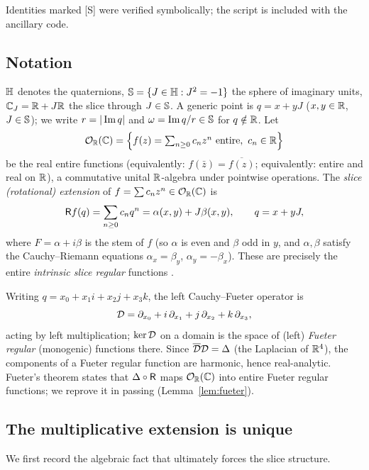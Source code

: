 \documentclass[11pt]{amsart}
\theoremstyle{definition}
\theoremstyle{remark}
\begin{document}
Identities marked [S] were verified symbolically; the script is included
with the ancillary code.

\subsection{Notation}\label{app:notation}

$\mathbb{H}$ denotes the quaternions, $\mathbb{S}=\{J\in\mathbb{H}: J^2=-1\}$ the sphere of
imaginary units, $\mathbb{C}_J=\mathbb{R}+J\mathbb{R}$ the slice through $J\in\mathbb{S}$.  A generic
point is $q=x+yJ$ ($x,y\in\mathbb{R}$, $J\in\mathbb{S}$); we write $r=|\operatorname{Im} q|$ and
$\omega=\operatorname{Im} q/r\in\mathbb{S}$ for $q\notin\mathbb{R}$.  Let
\[
\mathcal{O}_{\mathbb{R}}(\mathbb{C})=\Bigl\{f(z)=\textstyle\sum_{n\ge0}c_nz^n \text{ entire},\ c_n\in\mathbb{R}\Bigr\}
\]
be the real entire functions (equivalently: $f(\bar z)=\overline{f(z)}$;
equivalently: entire and real on $\mathbb{R}$), a commutative unital
$\mathbb{R}$-algebra under pointwise operations.  The \emph{slice (rotational)
extension} of $f=\sum c_nz^n\in\mathcal{O}_{\mathbb{R}}(\mathbb{C})$ is
\[
\mathsf{R} f(q)=\sum_{n\ge0}c_nq^n=\alpha(x,y)+J\beta(x,y),\qquad q=x+yJ,
\]
where $F=\alpha+i\beta$ is the stem of $f$ (so $\alpha$ is even and $\beta$
odd in $y$, and $\alpha,\beta$ satisfy the Cauchy--Riemann equations
$\alpha_x=\beta_y$, $\alpha_y=-\beta_x$).  These are precisely the entire
\emph{intrinsic slice regular} functions \cite{app-GentiliStruppa,
app-GhiloniPerotti}.

Writing $q=x_0+x_1i+x_2j+x_3k$, the left Cauchy--Fueter operator is
\[
\mathcal{D}=\partial_{x_0}+i\,\partial_{x_1}+j\,\partial_{x_2}+k\,\partial_{x_3},
\]
acting by left multiplication; $\ker\mathcal{D}$ on a domain is the space of
(left) \emph{Fueter regular} (monogenic) functions there.  Since
$\overline{\mathcal{D}}\mathcal{D}=\Delta$ (the Laplacian of $\mathbb{R}^4$), the components of a
Fueter regular function are harmonic, hence real-analytic.  Fueter's
theorem \cite{app-Fueter,app-Sce,app-Qian} states that
$\Delta\circ\mathsf{R}$ maps $\mathcal{O}_{\mathbb{R}}(\mathbb{C})$ into entire Fueter regular functions; we
reprove it in passing (Lemma~\ref{lem:fueter}).

\subsection{The multiplicative extension is unique}\label{app:mult}

We first record the algebraic fact that ultimately forces the slice
structure.
\end{document}
